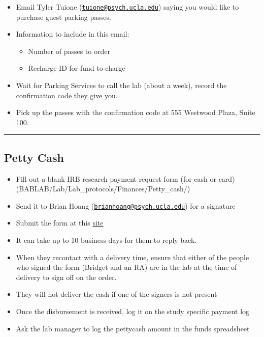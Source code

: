 \documentclass[]{book}
\providecommand{\tightlist}{%
  \setlength{\itemsep}{0pt}\setlength{\parskip}{0pt}}
\begin{document}
\begin{itemize}
\tightlist
\item
  Email Tyler Tuione (\href{mailto:tuione@psych.ucla.edu}{\nolinkurl{tuione@psych.ucla.edu}}) saying you would like to purchase guest parking passes.
\item
  Information to include in this email:

  \begin{itemize}
  \tightlist
  \item
    Number of passes to order
  \item
    Recharge ID for fund to charge
  \end{itemize}
\item
  Wait for Parking Services to call the lab (about a week), record the confirmation code they give you.
\item
  Pick up the passes with the confirmation code at 555 Westwood Plaza, Suite 100.
\end{itemize}

\begin{center}\rule{0.5\linewidth}{\linethickness}\end{center}

\hypertarget{petty-cash}{%
\subsection{Petty Cash}\label{petty-cash}}

\begin{itemize}
\tightlist
\item
  Fill out a blank IRB research payment request form (for cash or card)(BABLAB/Lab/Lab\_protocols/Finances/Petty\_cash/)
\item
  Send it to Brian Hoang (\href{mailto:brianhoang@psych.ucla.edu}{\nolinkurl{brianhoang@psych.ucla.edu}}) for a signature
\item
  Submit the form at this \href{https://sa.ucla.edu/MessageCenter/OneStop/Home/PostMessage?topicId=293}{site}
\item
  It can take up to 10 business days for them to reply back.
\item
  When they recontact with a delivery time, ensure that either of the people who signed the form (Bridget and an RA) are in the lab at the time of delivery to sign off on the order.
\item
  They will not deliver the cash if one of the signers is not present
\item
  Once the disbursement is received, log it on the study specific payment log
\item
  Ask the lab manager to log the pettycash amount in the funds spreadsheet
\end{itemize}
\end{document}
